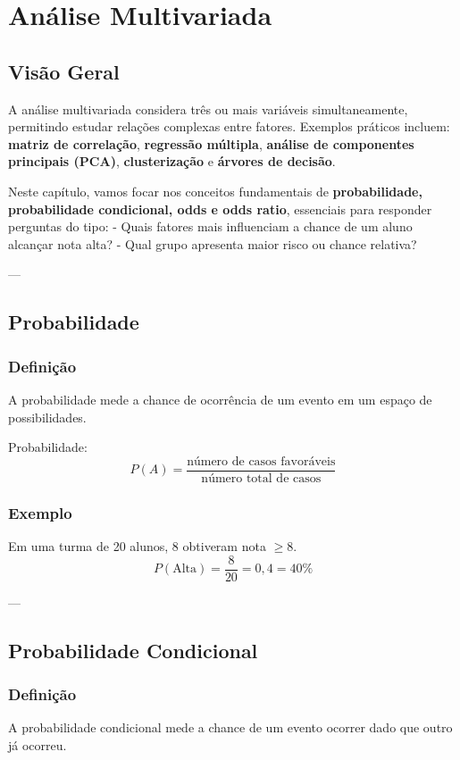 \chapter{Análise Multivariada}

\section{Visão Geral}
A análise multivariada considera três ou mais variáveis simultaneamente, permitindo estudar relações complexas entre fatores.  
Exemplos práticos incluem: \textbf{matriz de correlação}, \textbf{regressão múltipla}, \textbf{análise de componentes principais (PCA)}, \textbf{clusterização} e \textbf{árvores de decisão}.  

Neste capítulo, vamos focar nos conceitos fundamentais de \textbf{probabilidade, probabilidade condicional, odds e odds ratio}, essenciais para responder perguntas do tipo:  
- Quais fatores mais influenciam a chance de um aluno alcançar nota alta?  
- Qual grupo apresenta maior risco ou chance relativa?  

---

\section{Probabilidade}
\subsection*{Definição}
A probabilidade mede a chance de ocorrência de um evento em um espaço de possibilidades.

\begin{FormulaBox}
Probabilidade: 
\[
P(A) = \frac{\text{número de casos favoráveis}}{\text{número total de casos}}
\]
\end{FormulaBox}

\subsection*{Exemplo}
Em uma turma de 20 alunos, 8 obtiveram nota $\ge 8$.  
\[
P(\text{Alta}) = \frac{8}{20} = 0,4 = 40\%
\]

---

\section{Probabilidade Condicional}
\subsection*{Definição}
A probabilidade condicional mede a chance de um evento ocorrer dado que outro já ocorreu.

